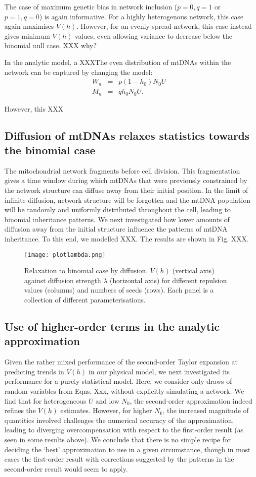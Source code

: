 \documentclass{article}
\begin{document}
The case of maximum genetic bias in network inclusion ($p=0,q=1$ or $p=1,q=0$) is again informative. For a highly heterogenous network, this case again maximises $V(h)$. However, for an evenly spread network, this case instead gives minimum $V(h)$ values, even allowing variance to decrease below the binomial null case. XXX why? 

In the analytic model, a XXXThe even distribution of mtDNAs within the network can be captured by changing the model:
\begin{eqnarray*}
  W_n & = & p(1-h_0)N_0 U \\
  M_n & = & qh_0 N_0 U.
\end{eqnarray*}

However, this XXX

\subsection*{Diffusion of mtDNAs relaxes statistics towards the binomial case}
The mitochondrial network fragments before cell division. This fragmentation gives a time window during which mtDNAs that were previously constrained by the network structure can diffuse away from their initial position. In the limit of infinite diffusion, network structure will be forgotten and the mtDNA population will be randomly and uniformly distributed throughout the cell, leading to binomial inheritance patterns. We next investigated how lower amounts of diffusion away from the initial structure influence the patterns of mtDNA inheritance. To this end, we modelled XXX. The results are shown in Fig. XXX.

\begin{figure}
  \texttt{[image: plotlambda.png]}
  \caption{Relaxation to binomial case by diffusion. $V(h)$ (vertical axis) against diffusion strength $\lambda$ (horizontal axis) for different repulsion values (columns) and numbers of seeds (rows). Each panel is a collection of different parameterisations.}
  \label{fig1a}
\end{figure}

\subsection*{Use of higher-order terms in the analytic approximation} 
Given the rather mixed performance of the second-order Taylor expansion at predicting trends in $V(h) $ in our physical model, we next investigated its performance for a purely statistical model. Here, we consider only draws of random variables from Eqns. Xxx, without explicitly simulating a network. We find that for heterogeneous $U$ and low $N_0$, the second-order approximation indeed refines the $V(h) $ estimates. However, for higher $N_0$, the increased magnitude of quantities involved challenges the numerical accuracy of the approximation, leading to diverging overcompensation with respect to the first-order result (as seen in some results above). We conclude that there is no simple recipe for deciding the `best' approximation to use in a given circumstance, though in most cases the first-order result with corrections suggested by the patterns in the second-order result would seem to apply. 
\end{document}
